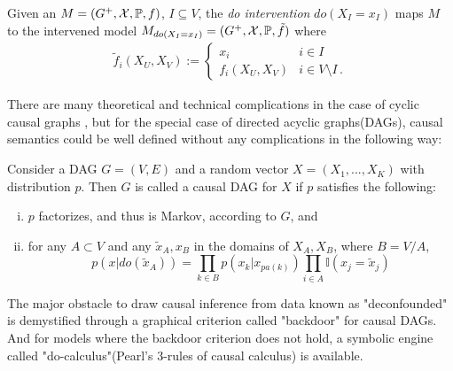 \begin{Def}[do intervention]
	\label{def:p-intervention}
	Given an \SCM $M=(G^+,\mathcal{X},\mathbb{P}, f)$, $I \subseteq V$, the \emph{do intervention} $do(X_I=x_I)$ maps $M$ to the intervened model $M_{do(X_I = x_I)} = (G^+,\mathcal{X},\mathbb{P}, \tilde{f})$ where
	$$
	\begin{aligned}
	\tilde f_i(X_U,X_V) := \begin{cases}
	x_i & i \in I \\
	f_i(X_U,X_V) & i \in V \setminus I \,.
	\end{cases}
	\end{aligned}
	$$
\end{Def}


There are many theoretical and technical complications in the case of cyclic causal graphs \cite{Bongers2016}, but for the special case of directed acyclic graphs(DAGs), causal semantics could be well defined without any complications in the following way:

\begin{Def}
	Consider a DAG $G=(V, E)$ and a random vector $X = (X_1, ..., X_K)$ with distribution $p$. Then $G$ is called a causal DAG for $X$ if $p$ satisfies the following:
	\begin{enumerate}[(i)]
		\setlength\itemsep{0em}
		\item $p$ factorizes, and thus is Markov, according to $G$, and
		\item for any $A \subset V$ and any $\tilde{x}_A, x_B$ in the domains of $X_A, X_B$, where $B = V/A$, 
		$$
p(x	| do(\tilde{x}_A)) = \prod_{k \in B} p(x_k|x_{pa(k)})  \prod_{i \in A} \mathbb{I}(x_j = \tilde{x}_j)
		$$
	\end{enumerate}
\end{Def}

 

The major obstacle to draw causal inference from data known as "deconfounded" is demystified through a graphical criterion called "backdoor" for causal DAGs. And for models where the backdoor criterion does not hold, a symbolic engine called "do-calculus"(Pearl's 3-rules of causal calculus)  is available. 



